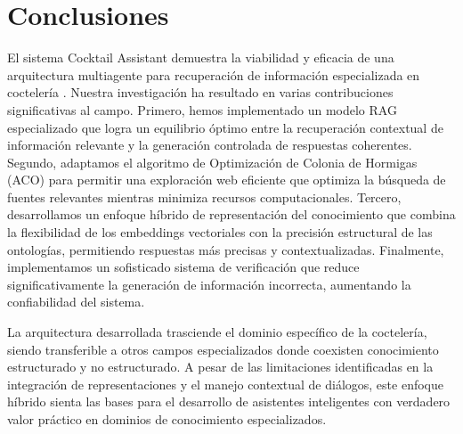 \documentclass[runningheads]{llncs}
\begin{document}
\section{Conclusiones}

El sistema Cocktail Assistant demuestra la viabilidad y eficacia de una arquitectura multiagente para recuperación de información especializada en coctelería \cite{multiagent_simple}. Nuestra investigación ha resultado en varias contribuciones significativas al campo. Primero, hemos implementado un modelo RAG especializado \cite{rag_simple} que logra un equilibrio óptimo entre la recuperación contextual de información relevante y la generación controlada de respuestas coherentes. Segundo, adaptamos el algoritmo de Optimización de Colonia de Hormigas (ACO) \cite{aco_simple} para permitir una exploración web eficiente que optimiza la búsqueda de fuentes relevantes mientras minimiza recursos computacionales. Tercero, desarrollamos un enfoque híbrido de representación del conocimiento que combina la flexibilidad de los embeddings vectoriales con la precisión estructural de las ontologías, permitiendo respuestas más precisas y contextualizadas. Finalmente, implementamos un sofisticado sistema de verificación que reduce significativamente la generación de información incorrecta, aumentando la confiabilidad del sistema.

La arquitectura desarrollada trasciende el dominio específico de la coctelería, siendo transferible a otros campos especializados donde coexisten conocimiento estructurado y no estructurado. A pesar de las limitaciones identificadas en la integración de representaciones y el manejo contextual de diálogos, este enfoque híbrido sienta las bases para el desarrollo de asistentes inteligentes con verdadero valor práctico en dominios de conocimiento especializados.




\end{document}
